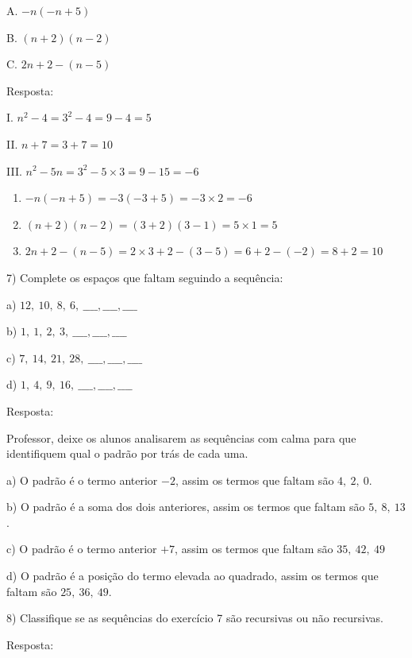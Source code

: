 A. \(- n( - n + 5)\)

B. \((n + 2)(n - 2)\)

C. \(2n + 2 - (n - 5)\)

Resposta:

I. \(n^{2} - 4 = 3^{2} - 4 = 9 - 4 = 5\)

II. \(n + 7 = 3 + 7 = 10\)

III. \(n^{2} - 5n = 3^{2} - 5 \times 3 = 9 - 15 = - 6\)

\begin{enumerate}
\def\labelenumi{\Alph{enumi}.}
\item
  \(- n\left( - n + 5 \right) = - 3\left( - 3 + 5 \right) = - 3 \times 2 = - 6\)
\item
  \(\left( n + 2 \right)\left( n - 2 \right) = \left( 3 + 2 \right)\left( 3 - 1 \right) = 5 \times 1 = 5\)
\item
  \(2n + 2 - \left( n - 5 \right) = 2 \times 3 + 2 - \left( 3 - 5 \right) = 6 + 2 - \left( - 2 \right) = 8 + 2 = 10\)
\end{enumerate}


7) Complete os espaços que faltam seguindo a sequência:

a) \(12,\ 10,\ 8,\ 6,\ \_\_\_\_,\_\_\_\_,\_\_\_\_\)

b) \(1,\ 1,\ 2,\ 3,\ \_\_\_\_,\_\_\_\_,\_\_\_\_\)

c) \(7,\ 14,\ 21,\ 28,\ \_\_\_\_,\_\_\_\_,\_\_\_\_\)

d) \(1,\ 4,\ 9,\ 16,\ \_\_\_\_,\_\_\_\_,\_\_\_\_\)

Resposta:

Professor, deixe os alunos analisarem as sequências com calma para que
identifiquem qual o padrão por trás de cada uma.

a) O padrão é o termo anterior \(- 2\), assim os termos que faltam são
\(4,\ 2,\ 0\).

b) O padrão é a soma dos dois anteriores, assim os termos que faltam são
\(5,\ 8,\ 13\).

c) O padrão é o termo anterior \(+ 7\), assim os termos que faltam são
\(35,\ 42,\ 49\)

d) O padrão é a posição do termo elevada ao quadrado, assim os termos
que faltam são \(25,\ 36,\ 49\).

8) Classifique se as sequências do exercício 7 são recursivas ou não
recursivas.

Resposta:

